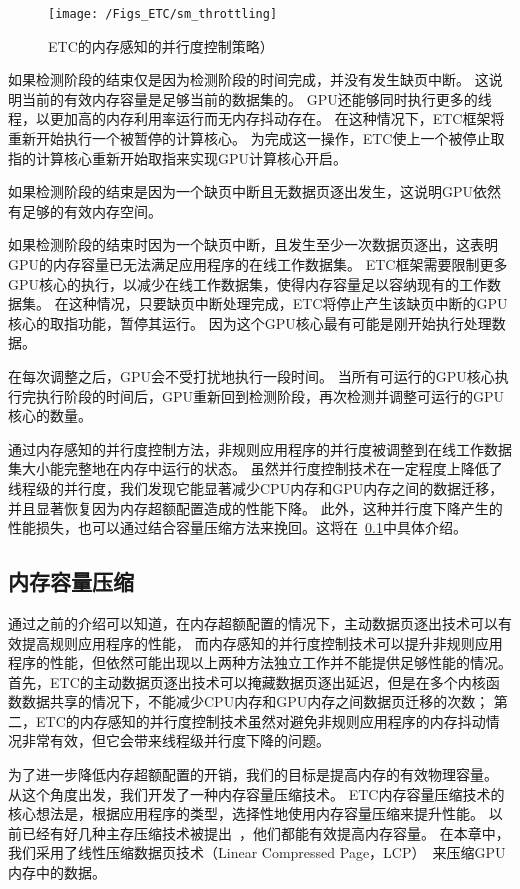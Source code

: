 \begin{figure}[htbp] %
  \centering
  \texttt{[image: /Figs\_ETC/sm\_throttling]}
  \caption{ETC的内存感知的并行度控制策略）}
  \label{fig:sm_throttling}
\end{figure}

如果检测阶段的结束仅是因为检测阶段的时间完成，并没有发生缺页中断。
这说明当前的有效内存容量是足够当前的数据集的。
GPU还能够同时执行更多的线程，以更加高的内存利用率运行而无内存抖动存在。
在这种情况下，ETC框架将重新开始执行一个被暂停的计算核心。
为完成这一操作，ETC使上一个被停止取指的计算核心重新开始取指来实现GPU计算核心开启。

如果检测阶段的结束是因为一个缺页中断且无数据页逐出发生，这说明GPU依然有足够的有效内存空间。

如果检测阶段的结束时因为一个缺页中断，且发生至少一次数据页逐出，这表明GPU的内存容量已无法满足应用程序的在线工作数据集。
ETC框架需要限制更多GPU核心的执行，以减少在线工作数据集，使得内存容量足以容纳现有的工作数据集。
在这种情况，只要缺页中断处理完成，ETC将停止产生该缺页中断的GPU核心的取指功能，暂停其运行。
因为这个GPU核心最有可能是刚开始执行处理数据。

在每次调整之后，GPU会不受打扰地执行一段时间。
当所有可运行的GPU核心执行完执行阶段的时间后，GPU重新回到检测阶段，再次检测并调整可运行的GPU核心的数量。

通过内存感知的并行度控制方法，非规则应用程序的并行度被调整到在线工作数据集大小能完整地在内存中运行的状态。
虽然并行度控制技术在一定程度上降低了线程级的并行度，我们发现它能显著减少CPU内存和GPU内存之间的数据迁移，并且显著恢复因为内存超额配置造成的性能下降。
此外，这种并行度下降产生的性能损失，也可以通过结合容量压缩方法来挽回。这将在~\ref{compress}中具体介绍。

\subsection{内存容量压缩}
\label{compress}
通过之前的介绍可以知道，在内存超额配置的情况下，主动数据页逐出技术可以有效提高规则应用程序的性能，
而内存感知的并行度控制技术可以提升非规则应用程序的性能，但依然可能出现以上两种方法独立工作并不能提供足够性能的情况。
首先，ETC的主动数据页逐出技术可以掩藏数据页逐出延迟，但是在多个内核函数数据共享的情况下，不能减少CPU内存和GPU内存之间数据页迁移的次数；
第二，ETC的内存感知的并行度控制技术虽然对避免非规则应用程序的内存抖动情况非常有效，但它会带来线程级并行度下降的问题。

为了进一步降低内存超额配置的开销，我们的目标是提高内存的有效物理容量。
从这个角度出发，我们开发了一种内存容量压缩技术。
ETC内存容量压缩技术的核心想法是，根据应用程序的类型，选择性地使用内存容量压缩来提升性能。
以前已经有好几种主存压缩技术被提出~，他们都能有效提高内存容量。
在本章中，我们采用了线性压缩数据页技术（Linear Compressed Page，LCP）~来压缩GPU内存中的数据。

